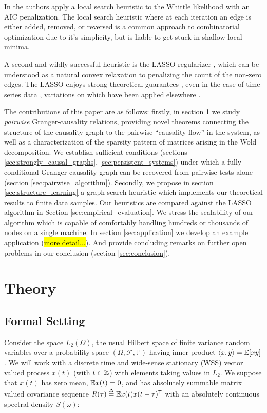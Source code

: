 \documentclass[12pt]{article}
\begin{document}
In \cite{bach2004learning} the authors apply a local search heuristic
to the Whittle likelihood with an AIC penalization.  The local search
heuristic where at each iteration an edge is either added, removed, or
reversed is a common approach to combinatorial optimization due to
it's simplicity, but is liable to get stuck in shallow local minima.

A second and wildly successful heuristic is the LASSO regularizer
\cite{tibshirani1996regression}, which can be understood as a natural
convex relaxation to penalizing the count of the non-zero edges.  The
LASSO enjoys strong theoretical guarantees \cite{wainwright2009sharp},
even in the case of time series data \cite{basu2015}
\cite{wong2016lasso}, variations on which have been applied elsewhere
\cite{DBLP:journals/corr/HallacPBL17} \cite{haufe2008sparse}
\cite{bolstad2011causal} \cite{he2013stationary}.

The contributions of this paper are as follows: firstly, in section
\ref{sec:theory} we study \textit{pairwise} Granger-causality
relations, providing novel theorems connecting the structure of the
causality graph to the pairwise ``causality flow'' in the system, as
well as a characterization of the sparsity pattern of matrices arising
in the Wold decomposition.  We establish sufficient conditions
(sections \ref{sec:strongly_causal_graphs},
\ref{sec:persistent_systems}) under which a fully conditional
Granger-causality graph can be recovered from pairwise tests alone
(section \ref{sec:pairwise_algorithm}).  Secondly, we propose in
section \ref{sec:structure_learning} a graph search heuristic which
implements our theoretical results to finite data samples.  Our
heuristics are compared against the LASSO algorithm in Section
\ref{sec:empirical_evaluation}.  We stress the scalability of our
algorithm which is capable of comfortably handling hundreds or
thousands of nodes on a single machine.  In section
\ref{sec:application} we develop an example application (\hl{more
  detail...}).  And provide concluding remarks on further open
problems in our conclusion (section \ref{sec:conclusion}).


\section{Theory}
\label{sec:theory}
\subsection{Formal Setting}
Consider the space $L_2(\Omega)$, the usual Hilbert space of finite
variance random variables over a probability space
$(\Omega, \mathcal{F}, \mathbb{P})$ having inner product
$\langle x, y \rangle = \mathbb{E}[xy]$.  We will work with a discrete time and
wide-sense stationary (WSS) vector valued process $x(t)$ (with
$t \in \mathbb{Z}$) with elements taking values in $L_2$.  We suppose that
$x(t)$ has zero mean, $\mathbb{E} x(t) = 0$, and has absolutely summable
matrix valued covariance sequence
$R(\tau) \overset{\Delta}{=} \mathbb{E} x(t)x(t - \tau)^{\mathsf{T}}$ with an absolutely
continuous spectral density $S(\omega)$:
\end{document}
